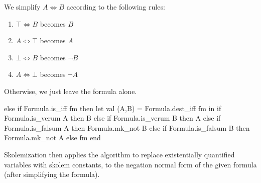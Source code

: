 \begin{node}
We simplify $A\iff B$ according to the following rules:
\begin{enumerate}
\item $\top\iff B$ becomes $B$
\item $A\iff\top$ becomes $A$
\item $\bot\iff B$ becomes $\neg B$
\item $A\iff\bot$ becomes $\neg A$
\end{enumerate}
Otherwise, we just leave the formula alone.
\end{node}

\nwenddocs{}\endmoddef\nwstartdeflinemarkup{}\nwenddeflinemarkup
else if Formula.is_iff fm
then let val (A,B) = Formula.dest_iff fm
     in if Formula.is_verum A
        then B
        else if Formula.is_verum B
        then A
        else if Formula.is_falsum A
        then Formula.mk_not B
        else if Formula.is_falsum B
        then Formula.mk_not A
        else fm
     end
\nwendcode{}\nwdocspar

\begin{node}
Skolemization then applies the algorithm to replace existentially
quantified variables with skolem constants, to the negation normal
form of the given formula (after simplifying the formula).
\end{node}

